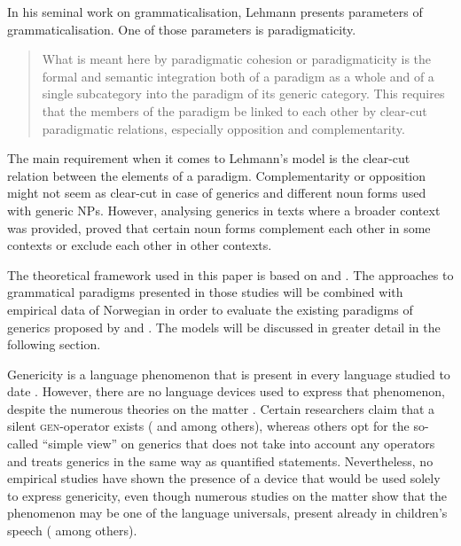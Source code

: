 \documentclass[output=paper]{langsci/langscibook}
\begin{document}
In his seminal work on grammaticalisation, Lehmann presents parameters of grammaticalisation. One of those parameters is paradigmaticity.

\begin{quote}
    What is meant here by paradigmatic cohesion or paradigmaticity is the formal and semantic integration both of a paradigm as a whole and of a single subcategory into the paradigm of its generic category. This requires that the members of the paradigm be linked to each other by clear-cut paradigmatic relations, especially opposition and complementarity. \citep[141]{Lehmann2015}
\end{quote}

The main requirement when it comes to Lehmann's model is the clear-cut relation between the elements of a paradigm. Complementarity or opposition might not seem as clear-cut in case of generics and different noun forms used with generic NPs. However, analysing generics in texts where a broader context was provided, proved that certain noun forms complement each other in some contexts or exclude each other in other contexts.

The theoretical framework used in this paper is based on \citet{Diewald2009,DiewaldSmirnova2010} and \citet{Lehmann2015}. The approaches to grammatical paradigms presented in those studies will be combined with empirical data of Norwegian in order to evaluate the existing paradigms of generics proposed by \citet{Radden2007,Radden2009} and \citet{Pettersson1976}. The models will be discussed in greater detail in the following section. 

Genericity is a language phenomenon that is present in every language studied to date \citet{Behrens2000,Behrens2005}. However, there are no language devices used to express that phenomenon, despite the numerous theories on the matter \citep{Liebesman2011,Collins2018}. Certain researchers claim that a silent \textsc{gen}-operator exists (\citealp{Carlson1977,Carlson1982} and \citealp{Chierchia1998} among others), whereas others opt for the so-called ``simple view'' on generics \citep{Liebesman2011} that does not take into account any operators and treats generics in the same way as quantified statements. Nevertheless, no empirical studies have shown the presence of a device that would be used solely to express genericity, even though numerous studies on the matter show that the phenomenon may be one of the language universals, present already in children's speech (\citealp{Gelman-Tardif1998, LeslieGelman2012} among others).
\end{document}
